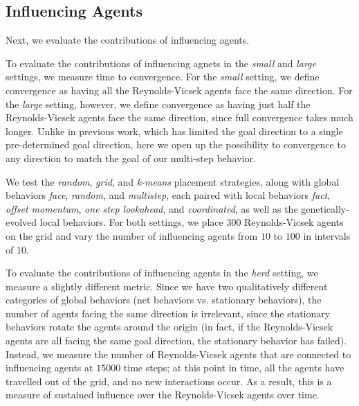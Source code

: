 \subsection{Influencing Agents}
Next, we evaluate the contributions of influencing agents.

To evaluate the contributions of influencing agnets in the \textit{small} and
\textit{large} settings, we measure time to convergence.
For the \textit{small} setting, we define convergence as having all the
Reynolds-Vicsek agents face the same direction.
For the \textit{large} setting, however, we define convergence as having just
half the Reynolds-Vicsek agents face the same direction, since full convergence
takes much longer.
Unlike in previous work, which has limited the goal direction to a single
pre-determined goal direction, here we open up the possibility to convergence
to any direction to match the goal of our multi-step behavior.

We test the \textit{random}, \textit{grid}, and \textit{k-means} placement
strategies, along with global behaviors \textit{face}, \textit{random}, and
\textit{multistep}, each paired with local behaviors \textit{fact},
\textit{offset momentum}, \textit{one step lookahead}, and
\textit{coordinated}, as well as the genetically-evolved local behaviors.
For both settings, we place $300$ Reynolds-Vicsek agents on the grid and vary
the number of influencing agents from $10$ to $100$ in intervals of $10$.

To evaluate the contributions of influencing agents in the \textit{herd}
setting, we measure a slightly different metric.
Since we have two qualitatively different categories of global behaviors (net
behaviors vs. stationary behaviors), the number of agents facing the same
direction is irrelevant, since the stationary behaviors rotate the agents around
the origin (in fact, if the Reynolds-Vicsek agents are all facing the same
goal direction, the stationary behavior has failed).
Instead, we measure the number of Reynolds-Vicsek agents that are connected to
influencing agents at $15000$ time steps; at this point in time, all the agents
have travelled out of the grid, and no new interactions occur.
As a result, this is a measure of sustained influence over the Reynolds-Vicsek
agents over time.

